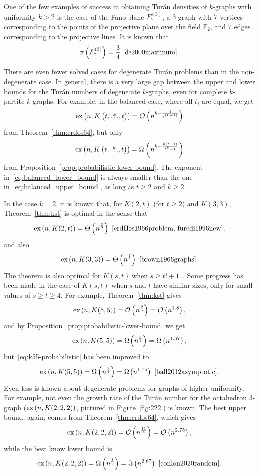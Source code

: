 One of the few examples of success in obtaining Turán densities of $k$-graphs with uniformity $k > 2$ is the case of
the Fano plane $F^{(3)}_7$, a $3$-graph with $7$ vertices corresponding to the points
of the projective plane over the field $\mathbb{F}_2$,
and $7$ edges corresponding to the projective lines.
It is known that
\[
    \pi\left(F^{(3)}_7\right) = \frac{3}{4}~\cite{de2000maximum}.
\]

There are even fewer solved cases for degenerate Turán problems than in the non-degenerate case.
In general, there is a very large gap between the upper and lower bounds for the Turán numbers of degenerate $k$-graphs,
even for complete $k$-partite $k$-graphs.
For example, in the balanced case, where all $t_i$ are equal, we get
\begin{equation} \label{eq:balanced_upper_bound}
    \text{ex} \left( n, K\left(t, \overset{k}{\dots}, t\right) \right) = \mathcal{O}\left(n^{k - \frac{1}{t^{(k-1)}}}\right)
\end{equation}
from Theorem~\ref{thm:erdos64}, but only
\begin{equation} \label{eq:balanced_lower_bound}
    \text{ex} \left( n, K\left(t, \overset{k}{\dots}, t\right) \right) = \Omega\left(n^{k - \frac{k(t-1)}{t^k - 1}}\right)
\end{equation}
from Proposition~\ref{prop:probabilistic-lower-bound}.
The exponent in~\eqref{eq:balanced_lower_bound} is always
smaller than the one in~\eqref{eq:balanced_upper_bound},
as long as $t \geq 2$ and $k \geq 2$.

In the case $k=2$, it is known that, for $K(2, t)$ (for $t \geq 2$) and $K(3, 3)$,
Theorem~\ref{thm:kst} is optimal in the sense that
\[
    \text{ex} \left( n, K(2, t) \right)
    = \Theta\left(n^{\frac{3}{2}}\right)~\cite{erdHos1966problem, furedi1996new},
\]
and also
\[
    \text{ex} \left( n, K(3, 3) \right)
    = \Theta\left(n^{\frac{5}{3}}\right)~\cite{brown1966graphs}.
\]
The theorem is also optimal for $K(s, t)$ when $s \geq t! + 1$~\cite{kollar1996norm}.
Some progress has been made in the case of $K(s, t)$ when $s$ and $t$ have similar sizes,
only for small values of $s \geq t \geq 4$.
For example, Theorem~\ref{thm:kst} gives
\[
    \text{ex} \left( n, K(5,5) \right) = \mathcal{O}\left(n^{\frac{9}{5}}\right) = \mathcal{O}\left(n^{1.8}\right),
\]
and by Proposition~\ref{prop:probabilistic-lower-bound} we get
\begin{equation} \label{eq:k55-probabilistic}
    \text{ex} \left( n, K(5,5) \right)
= \Omega\left(n^{\frac{5}{3}}\right)
= \Omega\left(n^{1.67}\right),
\end{equation}
but~\eqref{eq:k55-probabilistic} has been improved to
\[
    \text{ex} \left( n, K(5,5) \right)
    = \Omega\left(n^{\frac{7}{4}}\right)
    = \Omega\left(n^{1.75}\right)~\cite{ball2012asymptotic}.
\]
Even less is known about degenerate problems for graphs of higher uniformity.
For example, not even the growth rate of the Turán number for the octahedron 3-graph
($\text{ex} \left( n, K(2, 2, 2) \right)$, pictured in Figure~\ref{fig:222}) is known.
The best upper bound, again, comes from Theorem~\ref{thm:erdos64}, which gives
\[
    \text{ex} \left( n, K(2, 2, 2) \right) = \mathcal{O}\left(n^{\frac{11}{4}}\right) = \mathcal{O}\left(n^{2.75}\right),
\]
while the best know lower bound is
\[
    \text{ex} \left( n, K(2, 2, 2) \right)
    = \Omega\left(n^{\frac{8}{3}}\right)
    = \Omega\left(n^{2.67}\right)~\cite{conlon2020random}.
\]


